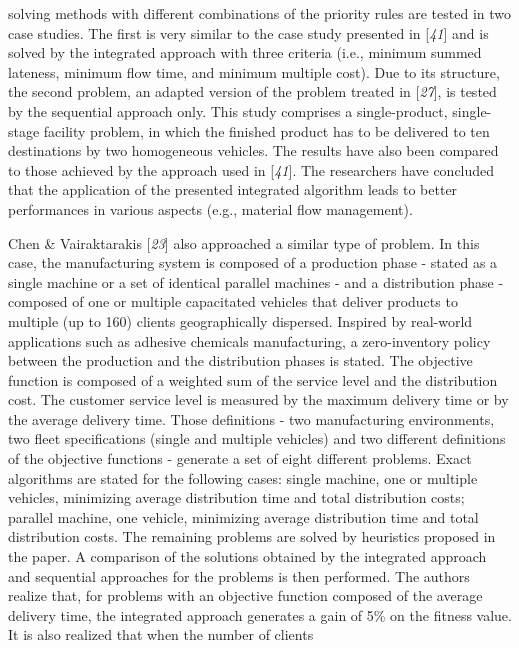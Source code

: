  solving methods with different combinations of the priority rules are tested in two
 case studies. The first is very similar to the case study presented in [\textit{41}] and is solved by the integrated approach with
 three criteria (i.e., minimum summed lateness, minimum flow time, and minimum
 multiple cost). Due to its structure, the second problem, an adapted version of the
 problem treated in [\textit{27}], is tested by the
 sequential approach only. This study comprises a single-product, single-stage
 facility problem, in which the finished product has to be delivered to ten
 destinations by two homogeneous vehicles. The results have also been compared to
 those achieved by the approach used in [\textit{41}].
 The researchers have concluded that the application of the presented integrated
 algorithm leads to better performances in various aspects (e.g., material flow
 management).\par Chen \& Vairaktarakis [\textit{23}] also approached
 a similar type of problem. In this case, the manufacturing system is composed of a
 production phase - stated as a single machine or a set of identical parallel machines
 - and a distribution phase - composed of one or multiple capacitated vehicles that
 deliver products to multiple (up to 160) clients geographically dispersed. Inspired
 by real-world applications such as adhesive chemicals manufacturing, a zero-inventory
 policy between the production and the distribution phases is stated. The objective
 function is composed of a weighted sum of the service level and the distribution
 cost. The customer service level is measured by the maximum delivery time or by the
 average delivery time. Those definitions - two manufacturing environments, two fleet
 specifications (single and multiple vehicles) and two different definitions of the
 objective functions - generate a set of eight different problems. Exact algorithms
 are stated for the following cases: single machine, one or multiple vehicles,
 minimizing average distribution time and total distribution costs; parallel machine,
 one vehicle, minimizing average distribution time and total distribution costs. The
 remaining problems are solved by heuristics proposed in the paper. A comparison of
 the solutions obtained by the integrated approach and sequential approaches for the
 problems is then performed. The authors realize that, for problems with an objective
 function composed of the average delivery time, the integrated approach generates a
 gain of 5\% on the fitness value. It is also realized that when the number of clients
